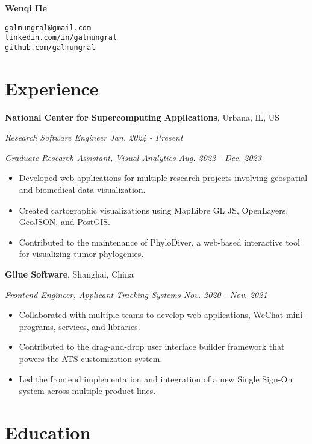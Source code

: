 \documentclass[11pt]{article}
\begin{document}
 

{\Huge\bf Wenqi He}

\vspace{10pt}
\texttt{galmungral@gmail.com}\\
\texttt{linkedin.com/in/galmungral}\\
\texttt{github.com/galmungral}\\

\section*{\sc Experience}

\vspace{1em}
\textbf{National Center for Supercomputing Applications}, Urbana, IL, US

\textit{Research Software Engineer \hfill Jan. 2024 - Present}

\textit{Graduate Research Assistant, Visual Analytics \hfill Aug. 2022 - Dec. 2023}

\begin{itemize}
\item Developed web applications for multiple research projects involving geospatial and biomedical data visualization.
\item Created cartographic visualizations using MapLibre GL JS, OpenLayers, GeoJSON, and PostGIS.
\item Contributed to the maintenance of PhyloDiver, a web-based interactive tool for visualizing tumor phylogenies.
\end{itemize}

\vspace{1em}
\textbf{Gllue Software}, Shanghai, China

\textit{Frontend Engineer, Applicant Tracking Systems \hfill Nov. 2020 - Nov. 2021}

\begin{itemize}
\item Collaborated with multiple teams to develop web applications, WeChat mini-programs, services, and libraries.
\item Contributed to the drag-and-drop user interface builder framework that powers the ATS customization system.
\item Led the frontend implementation and integration of a new Single Sign-On system across multiple product lines.
\end{itemize}

\section*{\sc Education}
\end{document}
